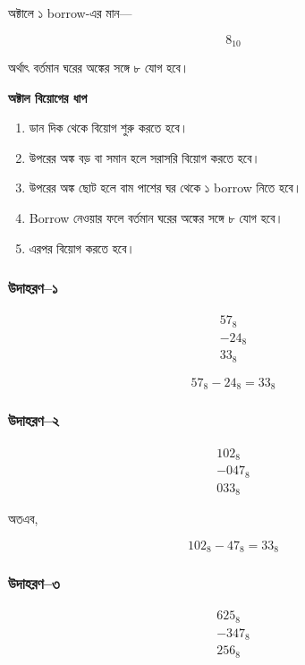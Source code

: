 অক্টালে ১
\textenglish{borrow}-এর মান—

\[
8_{10}
\]

অর্থাৎ বর্তমান ঘরের অঙ্কের সঙ্গে ৮ যোগ হবে।

\par\begingroup

\textbf{অক্টাল বিয়োগের ধাপ}

\begin{enumerate}
    \item ডান দিক থেকে বিয়োগ শুরু করতে হবে।
    \item উপরের অঙ্ক বড় বা সমান হলে সরাসরি বিয়োগ করতে হবে।
    \item উপরের অঙ্ক ছোট হলে বাম পাশের ঘর থেকে
    ১ \textenglish{borrow} নিতে হবে।
    \item \textenglish{Borrow} নেওয়ার ফলে বর্তমান ঘরের
    অঙ্কের সঙ্গে ৮ যোগ হবে।
    \item এরপর বিয়োগ করতে হবে।
\end{enumerate}
\par\endgroup


\subsubsection*{উদাহরণ--১}

\[
\begin{array}{r}
57_8\\
-24_8\\
\hline
33_8
\end{array}
\]

\[
\boxed{57_8-24_8=33_8}
\]

\subsubsection*{উদাহরণ--২}

\[
\begin{array}{r}
102_8\\
-047_8\\
\hline
033_8
\end{array}
\]

অতএব,

\[
\boxed{102_8-47_8=33_8}
\]

\subsubsection*{উদাহরণ--৩}

\[
\begin{array}{r}
625_8\\
-347_8\\
\hline
256_8
\end{array}
\]


